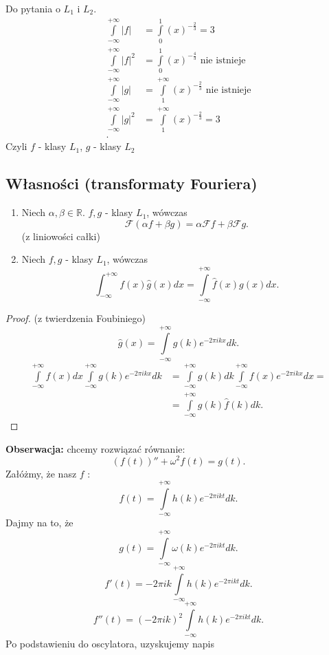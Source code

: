 \documentclass[../main.tex]{subfiles}
\begin{document}
Do pytania o $L_1$ i $L_2$.
\begin{align*}
    \int\limits_{-\infty}^{+\infty} |f| &= \int\limits_{0}^1 (x)^{-\frac{2}{3}} = 3\\
    \int\limits_{-\infty}^{+\infty} |f|^2 &= \int\limits_{0}^{1} (x)^{-\frac{4}{3}} \text{ nie istnieje}\\
    \int\limits_{-\infty}^{+\infty} |g| &=\int\limits_1^{+\infty} (x)^{-\frac{2}{3}} \text{ nie istnieje}\\
    \int\limits_{-\infty}^{+\infty} |g|^2 &= \int\limits_{1}^{+\infty} (x)^{-\frac{2}{3}} = 3\\
.\end{align*}
Czyli $f$ - klasy $L_1$, $g$ - klasy $L_2$
\subsection{Własności (transformaty Fouriera)}
\begin{enumerate}
    \item Niech $\alpha, \beta\in\mathbb{R}$. $f,g$ - klasy $L_1$, wówczas
        \[
            \mathcal{F}(\alpha f + \beta g) = \alpha \mathcal{F} f + \beta \mathcal{F} g
        .\]
    (z liniowości całki)
\item Niech $f,g$ - klasy $L_1$, wówczas
    \[
        \int_{-\infty}^{+\infty}f(x) \hat{g}(x) dx = \int\limits_{-\infty}^{+\infty}\hat{f}(x)g(x)dx
    .\]
\end{enumerate}
\begin{proof}
    (z twierdzenia Foubiniego)
\[
    \hat{g}(x) = \int\limits_{-\infty}^{+\infty}g(k) e^{-2\pi i kx}dk
.\]
\begin{align*}
    \int\limits_{-\infty}^{+\infty}f(x)dx \int\limits_{-\infty}^{+\infty}g(k)e^{-2\pi i kx}dk &= \int\limits_{-\infty}^{+\infty}g(k)dk \int\limits_{-\infty}^{+\infty}f(x) e^{-2\pi i kx}dx =\\
    &= \int\limits_{-\infty}^{+\infty}g(k)\hat{f}(k)dk
.\end{align*}
\end{proof}
\textbf{Obserwacja:} chcemy rozwiązać równanie:
\[
    \left( f(t) \right)'' + \omega^2 f(t) = g(t)
.\]
Załóżmy, że nasz $f$ :
        \[ f(t) = \int\limits_{-\infty}^{+\infty} h(k) e^{-2\pi i kt}dk
        .\]
        Dajmy na to, że
\[
    g(t) = \int\limits_{-\infty}^{+\infty}\omega(k)e^{-2\pi ik t}dk
.\]
\[
    f'(t) = -2\pi ik \int\limits_{-\infty}^{+\infty}h(k)e^{-2\pi i k t}dk
.\]
\[
    f''(t) = (-2\pi i k)^2 \int\limits_{-\infty}^{+\infty}h(k)e^{-2\pi i k t}dk
.\]
Po podstawieniu do oscylatora, uzyskujemy napis
\end{document}
